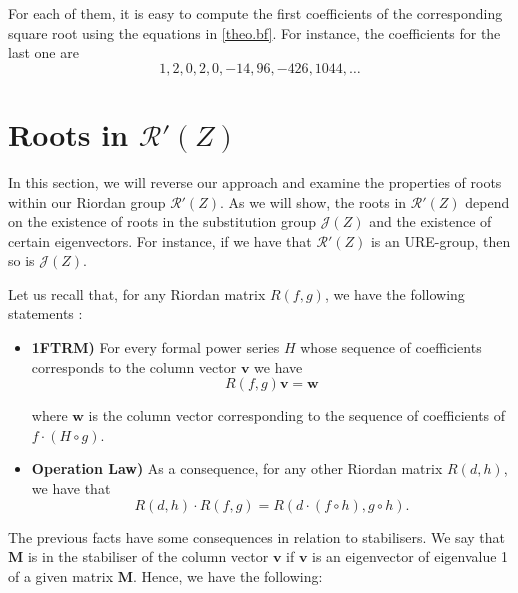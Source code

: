 \documentclass[preprint,12pt]{elsarticle}
\begin{document}
\noindent For each of them, it is easy to compute the first coefficients of the corresponding square root using the equations in \ref{theo.bf}. For instance,  the coefficients for the last one are
$$1,2,0,2,0,-14,96,-426,1044,\ldots $$






\section{Roots in \texorpdfstring{$\mathcal R'(Z)$}{R'(Z)}} \label{Section_RZ}

In this section, we will reverse our approach and examine the properties of roots within our Riordan group $\mathcal R'(Z)$. As we will show, the roots in $\mathcal R'(Z)$ depend on the existence of roots in the substitution group $\mathcal J(Z)$ and the existence of certain eigenvectors. For instance, if we have that $\mathcal R'(Z)$ is an URE-group, then so is $\mathcal J(Z)$.


Let us recall that, for any Riordan matrix $R(f,g)$, we have the following statements \cite{SGWW}:


\begin{itemize}

\item \textbf{1FTRM)} For every formal power series $H$ whose sequence of coefficients corresponds to the column vector $\bm v$ we have
\begin{equation}\label{eq.ft}R(f,g)\bm v=\bm w \end{equation}

\noindent where $\bm w$ is the column vector corresponding to the sequence of coefficients of $f\cdot (H\circ g)$.

\item \textbf{Operation Law)} As a consequence, for any other Riordan matrix $R(d,h)$, we have that
\begin{equation}\label{eq.ro} R(d,h)\cdot R(f,g)=R(d\cdot (f\circ h),g\circ h). \end{equation}

\end{itemize}

The previous facts have some consequences in relation to stabilisers. We say that $\bm M$ is in the stabiliser of the column vector $\bm v$ if $\bm v$ is an eigenvector of eigenvalue 1 of a given matrix $\bm M$.  Hence, we have the following: 
\end{document}

